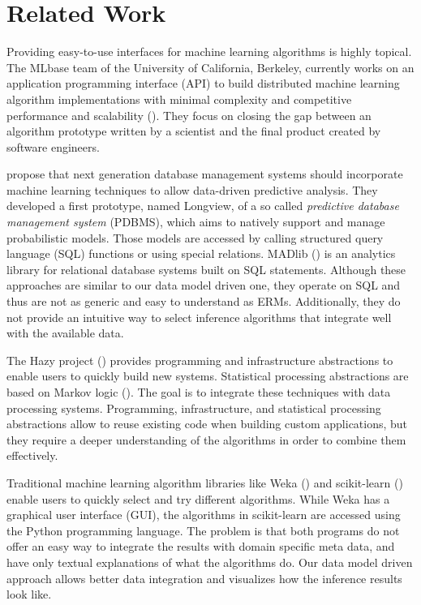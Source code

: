 \section{Related Work}

Providing easy-to-use interfaces for machine learning algorithms is highly topical. The MLbase team of the University of California, Berkeley, currently works on an application programming interface (API) to build distributed machine learning algorithm implementations with minimal complexity and competitive performance and scalability (\cite{sparks2013mli}). They focus on closing the gap between an algorithm prototype written by a scientist and the final product created by software engineers. 

\textcite{akdere2011case} propose that next generation database management systems should incorporate machine learning techniques to allow data-driven predictive analysis. They developed a first prototype, named Longview, of a so called \emph{predictive database management system} (PDBMS), which aims to natively support and manage probabilistic models. Those models are accessed by calling structured query language (SQL) functions or using special relations. MADlib (\cite{hellerstein2012madlib}) is an analytics library for relational database systems built on SQL statements. Although these approaches are similar to our data model driven one, they operate on SQL and thus are not as generic and easy to understand as ERMs. Additionally, they do not provide an intuitive way to select inference algorithms that integrate well with the available data.

The Hazy project (\cite{kumar2013hazy}) provides programming and infrastructure abstractions to enable users to quickly build new systems. Statistical processing abstractions are based on Markov logic (\cite{domingos2007markov}). The goal is to integrate these techniques with data processing systems. Programming, infrastructure, and statistical processing abstractions allow to reuse existing code when building custom applications, but they require a deeper understanding of the algorithms in order to combine them effectively.

Traditional machine learning algorithm libraries like Weka (\cite{hall2009weka}) and scikit-learn (\cite{scikit-learn}) enable users to quickly select and try different algorithms. While Weka has a graphical user interface (GUI), the algorithms in scikit-learn are accessed using the Python programming language. The problem is that both programs do not offer an easy way to integrate the results with domain specific meta data, and have only textual explanations of what the algorithms do. Our data model driven approach allows better data integration and visualizes how the inference results look like.

